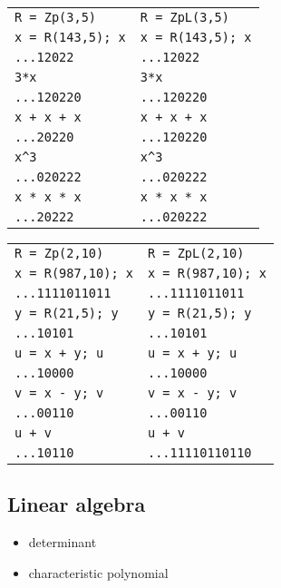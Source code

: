 \documentclass[sigconf]{acmart}
\theoremstyle{definition}
\begin{document}
\begin{tabular}{|l|l|}
\verb?R = Zp(3,5)? & \verb?R = ZpL(3,5)? \\
\verb?x = R(143,5); x? & \verb?x = R(143,5); x? \\
\hfill\verb?...12022? & \hfill\verb?...12022? \\
\verb?3*x? & \verb?3*x? \\
\hfill\verb?...120220? & \hfill\verb?...120220? \\
\verb?x + x + x? & \verb?x + x + x? \\
\hfill\verb?...20220? & \hfill\verb?...120220? \\
\verb?x^3? & \verb?x^3? \\
\hfill\verb?...020222? & \hfill\verb?...020222? \\
\verb?x * x * x? & \verb?x * x * x? \\
\hfill\verb?...20222? & \hfill\verb?...020222? \\
\end{tabular}

\begin{tabular}{|l|l|}
\verb?R = Zp(2,10)? & \verb?R = ZpL(2,10)? \\
\verb?x = R(987,10); x? & \verb?x = R(987,10); x? \\
\hfill\verb?...1111011011? & \hfill\verb?...1111011011? \\
\verb?y = R(21,5); y? & \verb?y = R(21,5); y? \\
\hfill\verb?...10101? & \hfill\verb?...10101? \\
\verb?u = x + y; u? & \verb?u = x + y; u? \\
\hfill\verb?...10000? & \hfill\verb?...10000? \\
\verb?v = x - y; v? & \verb?v = x - y; v? \\
\hfill\verb?...00110? & \hfill\verb?...00110? \\
\verb?u + v? & \verb?u + v? \\
\hfill\verb?...10110? & \hfill\verb?...11110110110? \\
\end{tabular}

\subsection{Linear algebra}

\begin{itemize}
\item determinant
\item characteristic polynomial
\end{itemize}
\end{document}
